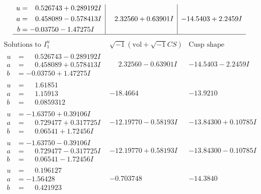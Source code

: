 \documentclass[1p]{elsarticle_modified}
\theoremstyle{definition}
\newcommand{\I}{\sqrt{-1}}
\begin{document}
$$\begin{array}{c|c|c}
\begin{aligned}
u &= \phantom{-}0.526743 + 0.289192 I \\
a &= \phantom{-}0.458089 - 0.578413 I \\
b &= -0.03750 - 1.47275 I\end{aligned}
 & \phantom{-}2.32560 + 0.63901 I & -14.5403 + 2.2459 I\\
 \hline 
 \end{array}$$\newpage$$\begin{array}{c|c|c}  
\text{Solutions to }I^u_{1}& \I (\text{vol} + \sqrt{-1}CS) & \text{Cusp shape}\\
 \hline 
\begin{aligned}
u &= \phantom{-}0.526743 - 0.289192 I \\
a &= \phantom{-}0.458089 + 0.578413 I \\
b &= -0.03750 + 1.47275 I\end{aligned}
 & \phantom{-}2.32560 - 0.63901 I & -14.5403 - 2.2459 I \\ \hline\begin{aligned}
u &= \phantom{-}1.61851\phantom{ +0.000000I} \\
a &= \phantom{-}1.15913\phantom{ +0.000000I} \\
b &= \phantom{-}0.0859312\phantom{ +0.000000I}\end{aligned}
 & -18.4664\phantom{ +0.000000I} & -13.9210\phantom{ +0.000000I} \\ \hline\begin{aligned}
u &= -1.63750 + 0.39106 I \\
a &= \phantom{-}0.729477 + 0.317725 I \\
b &= \phantom{-}0.06541 + 1.72456 I\end{aligned}
 & -12.19770 - 0.58193 I & -13.84300 + 0.10785 I \\ \hline\begin{aligned}
u &= -1.63750 - 0.39106 I \\
a &= \phantom{-}0.729477 - 0.317725 I \\
b &= \phantom{-}0.06541 - 1.72456 I\end{aligned}
 & -12.19770 + 0.58193 I & -13.84300 - 0.10785 I \\ \hline\begin{aligned}
u &= \phantom{-}0.196127\phantom{ +0.000000I} \\
a &= -1.56428\phantom{ +0.000000I} \\
b &= \phantom{-}0.421923\phantom{ +0.000000I}\end{aligned}
 & -0.703748\phantom{ +0.000000I} & -14.3840\phantom{ +0.000000I} \\ \hline\begin{aligned}

\end{aligned}
\end{array}$$
\end{document}
